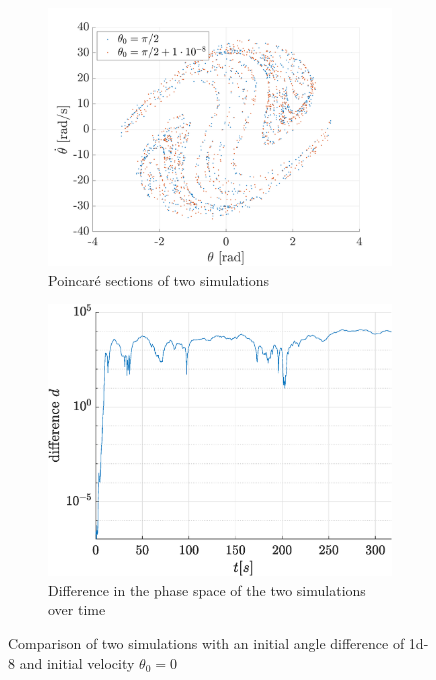 \documentclass[a4paper,12pt,twoside]{article}
\begin{document}
\begin{figure}[h]
\centering
\begin{subfigure}[t]{0.49\textwidth}
	\includegraphics[width=\textwidth]{graphs/f_sens.png}
	\caption{Poincaré sections of two simulations}
	\label{fig:f-senspcr}
\end{subfigure}
\begin{subfigure}[t]{0.45\textwidth}
	\includegraphics[width=\textwidth]{graphs/f_lyap.eps}
	\caption{Difference in the phase space of the two simulations over time}
	\label{fig:f-lyap}
\end{subfigure}
\caption{Comparison of two simulations with an initial angle difference of \num{1d-8} and initial velocity $\theta_0 = 0$}
\label{fig:f-sens}
\end{figure}
\end{document}
